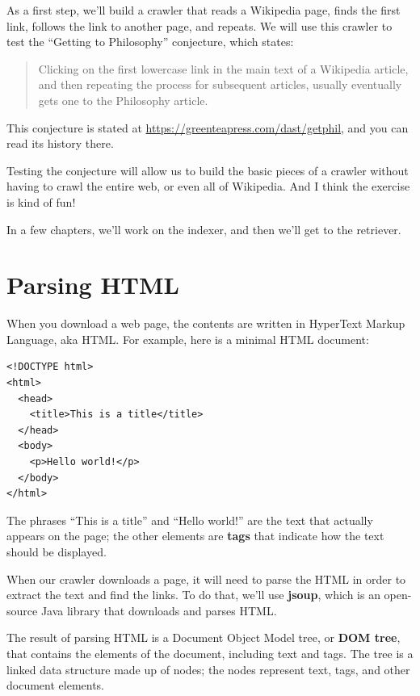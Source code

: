 \documentclass[12pt]{book}
\theoremstyle{exercise}
\begin{document}

As a first step, we'll build a crawler that reads a Wikipedia page,
finds the first link, follows the link to another page, and repeats. We
will use this crawler to test the ``Getting to Philosophy'' conjecture,
which states:

\begin{quote}
Clicking on the first lowercase link in the main text of a
Wikipedia article, and then repeating the process for subsequent
articles, usually eventually gets one to the Philosophy article.
\end{quote}

This conjecture is stated at
\url{https://greenteapress.com/dast/getphil}{},
and you can read its history there.

Testing the conjecture will allow us to build the basic pieces of a
crawler without having to crawl the entire web, or even all of
Wikipedia. And I think the exercise is kind of fun!

In a few chapters, we'll work on the indexer, and then we'll get to the
retriever.

\section{Parsing HTML}
\label{parsing-html}

When you download a web page, the contents are written in
HyperText Markup Language, aka HTML.
For example, here is a minimal HTML document:

\begin{verbatim}
<!DOCTYPE html>
<html>
  <head>
    <title>This is a title</title>
  </head>
  <body>
    <p>Hello world!</p>
  </body>
</html>
\end{verbatim}

The phrases ``This is a title'' and ``Hello world!'' are the text that
actually appears on the page; the other elements are \textbf{tags} that
indicate how the text should be displayed.


When our crawler downloads a page, it will need to parse the HTML in
order to extract the text and find the links. To do that, we'll use
\textbf{jsoup}, which is an open-source Java library that downloads and
parses HTML.


The result of parsing HTML is a Document Object Model tree, or
\textbf{DOM tree}, that contains the elements of the document, including
text and tags. The tree is a linked data structure made up of nodes; the
nodes represent text, tags, and other document elements.
\end{document}
